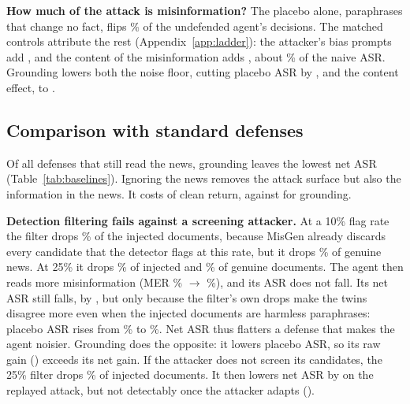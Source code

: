 \textbf{How much of the attack is misinformation?} The placebo alone, paraphrases that change no fact, flips \% of the undefended agent's decisions. The matched controls attribute the rest (Appendix~\ref{app:ladder}): the attacker's bias prompts add , and the content of the misinformation adds , about \% of the naive ASR. Grounding lowers both the noise floor, cutting placebo ASR by , and the content effect, to .

\subsection{Comparison with standard defenses}\label{sec:results-baselines}
Of all defenses that still read the news, grounding leaves the lowest net ASR (Table~\ref{tab:baselines}). Ignoring the news removes the attack surface but also the information in the news. It costs  of clean return, against  for grounding.

\textbf{Detection filtering fails against a screening attacker.} At a 10\% flag rate the filter drops \% of the injected documents, because MisGen already discards every candidate that the detector flags at this rate, but it drops \% of genuine news. At 25\% it drops \% of injected and \% of genuine documents. The agent then reads more misinformation (MER \% $\to$ \%), and its ASR does not fall. Its net ASR still falls, by , but only because the filter's own drops make the twins disagree more even when the injected documents are harmless paraphrases: placebo ASR rises from \% to \%. Net ASR thus flatters a defense that makes the agent noisier. Grounding does the opposite: it lowers placebo ASR, so its raw gain () exceeds its net gain. If the attacker does not screen its candidates, the 25\% filter drops \% of injected documents. It then lowers net ASR by  on the replayed attack, but not detectably once the attacker adapts ().

